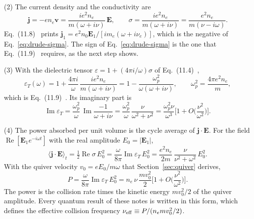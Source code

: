 \documentclass[11pt]{article}
\numberwithin{equation}{section}
\newcommand{\vv}{\mathbf v}
\newcommand{\Ev}{\mathbf E}
\newcommand{\nueff}{\nu_{\rm eff}}
\DeclareMathOperator{\Imag}{Im}
\DeclareMathOperator{\Real}{Re}
\begin{document}
{\noindent}(2) The current density and the conductivity are
\begin{equation}
\mathbf j=-en_e\vv=\frac{ie^2n_e}{m(\omega+i\nu)}\,\Ev,
\qquad
\sigma=\frac{ie^2n_e}{m(\omega+i\nu)}=\frac{e^2n_e}{m(\nu-i\omega)}.
\label{eq:drude-sigma}
\end{equation}
Eq.~(11.8)~\cite{Atzeni2004} prints $\mathbf j_1=e^2n_0\Ev_1/[im_e(\omega+i\nu_e)]$,
which is the negative of Eq.~\eqref{eq:drude-sigma}. The sign of
Eq.~\eqref{eq:drude-sigma} is the one that Eq.~(11.9)~\cite{Atzeni2004}
requires, as the next step shows.

{\noindent}(3) With the dielectric tensor $\varepsilon=1+(4\pi i/\omega)\sigma$
of Eq.~(11.4)~\cite{Atzeni2004},
\begin{equation}
\boxed{\;\varepsilon_T(\omega)=1+\frac{4\pi i}{\omega}\,\frac{ie^2n_e}{m(\omega+i\nu)}
=1-\frac{\omega_p^2}{\omega(\omega+i\nu)},\qquad
\omega_p^2=\frac{4\pi e^2n_e}{m},\;}
\label{eq:drude-eps}
\end{equation}
which is Eq.~(11.9)~\cite{Atzeni2004}. Its imaginary part is
\begin{equation}
\Imag\varepsilon_T=\frac{\omega_p^2}{\omega}\,\Imag\frac{-1}{\omega+i\nu}
=\frac{\omega_p^2}{\omega}\,\frac{\nu}{\omega^2+\nu^2}
=\frac{\omega_p^2\nu}{\omega^3}\Big[1+O\Big(\frac{\nu^2}{\omega^2}\Big)\Big].
\label{eq:drude-imeps}
\end{equation}

{\noindent}(4) The power absorbed per unit volume is the cycle average of
$\mathbf j\cdot\Ev$. For the field $\Real[\Ev_1e^{-i\omega t}]$ with the real
amplitude $E_0=|\Ev_1|$,
\begin{equation}
\langle\mathbf j\cdot\Ev\rangle_t=\tfrac12\Real\sigma\,E_0^2
=\frac{\omega}{8\pi}\Imag\varepsilon_T\,E_0^2
=\frac{e^2n_e}{2m}\,\frac{\nu}{\nu^2+\omega^2}\,E_0^2.
\end{equation}
With the quiver velocity $v_0=eE_0/m\omega$ that Section~\ref{sec:quiver}
derives,
\begin{equation}
\boxed{\;P=\frac{\omega}{8\pi}\Imag\varepsilon_T\,E_0^2
=n_e\,\nu\,\frac{mv_0^2}{2}\Big[1+O\Big(\frac{\nu^2}{\omega^2}\Big)\Big].\;}
\label{eq:P-drude}
\end{equation}
The power is the collision rate times the kinetic energy $mv_0^2/2$ of the
quiver amplitude. Every quantum result of these notes is written in this form,
which defines the effective collision frequency
$\nueff\equiv P/(n_emv_0^2/2)$.
\end{document}
